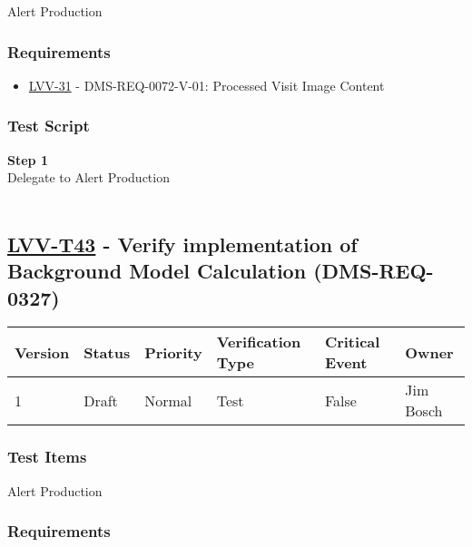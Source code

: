 Alert Production~

\hypertarget{requirements-19}{%
\subsubsection{Requirements}\label{requirements-19}}

\begin{itemize}
\tightlist
\item
  \href{https://jira.lsstcorp.org/browse/LVV-31}{LVV-31} -
  DMS-REQ-0072-V-01: Processed Visit Image Content
\end{itemize}

\hypertarget{test-script-19}{%
\subsubsection{Test Script}\label{test-script-19}}

\textbf{Step 1}\\
Delegate to Alert Production\\
~\\

\hypertarget{lvv-t43---verify-implementation-of-background-model-calculation-dms-req-0327}{%
\subsection{\texorpdfstring{\href{https://jira.lsstcorp.org/secure/Tests.jspa\#/testCase/LVV-T43}{LVV-T43}
- Verify implementation of Background Model Calculation
(DMS-REQ-0327)}{LVV-T43 - Verify implementation of Background Model Calculation (DMS-REQ-0327)}}\label{lvv-t43---verify-implementation-of-background-model-calculation-dms-req-0327}}

\begin{longtable}[]{@{}llllll@{}}
\toprule
Version & Status & Priority & Verification Type & Critical Event &
Owner\tabularnewline
\midrule
\endhead
1 & Draft & Normal & Test & False & Jim Bosch\tabularnewline
\bottomrule
\end{longtable}

\hypertarget{test-items-19}{%
\subsubsection{Test Items}\label{test-items-19}}

Alert Production~

\hypertarget{requirements-20}{%
\subsubsection{Requirements}\label{requirements-20}}

